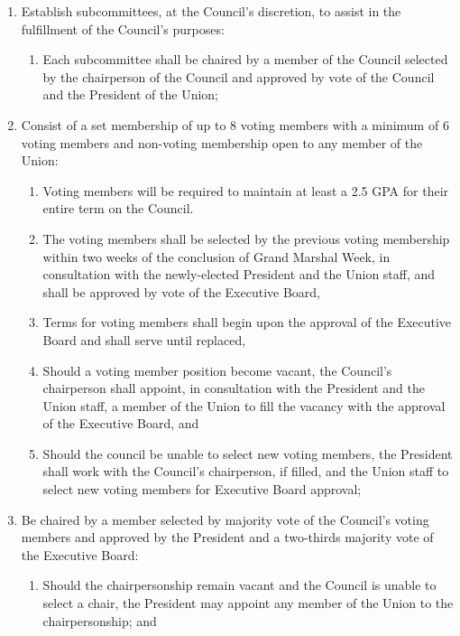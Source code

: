 \documentclass{uniondoc}
\begin{document}
\begin{enumerate}
\begin{enumerate}
\begin{enumerate}
    \item Operate in any additional capacities outlined in the Council’s Bylaws;
    \end{enumerate}
  \item Establish subcommittees, at the Council’s discretion, to assist in the fulfillment of the Council’s purposes:
    \begin{enumerate}
    \item Each subcommittee shall be chaired by a member of the Council selected by the chairperson of the Council and approved by vote of the Council and the President of the Union;
    \end{enumerate}
  \item Consist of a set membership of up to 8 voting members with a minimum of 6 voting members and non-voting membership open to any member of the Union:
    \begin{enumerate}
    \item Voting members will be required to maintain at least a 2.5 GPA for their entire term on the Council.
    \item The voting members shall be selected by the previous voting membership within two weeks of the conclusion of Grand Marshal Week, in consultation with the newly-elected President and the Union staff, and shall be approved by vote of the Executive Board,
    \item Terms for voting members shall begin upon the approval of the Executive Board and shall serve until replaced,
    \item Should a voting member position become vacant, the Council’s chairperson shall appoint, in consultation with the President and the Union staff, a member of the Union to fill the vacancy with the approval of the Executive Board, and
    \item Should the council be unable to select new voting members, the President shall work with the Council’s chairperson, if filled, and the Union staff to select new voting members for Executive Board approval;
    \end{enumerate}
  \item Be chaired by a member selected by majority vote of the Council’s voting members and approved by the President and a two-thirds majority vote of the Executive Board:
    \begin{enumerate}
    \item Should the chairpersonship remain vacant and the Council is unable to select a chair, the President may appoint any member of the Union to the chairpersonship; and

\end{enumerate}
\end{enumerate}
\end{enumerate}
\end{document}
